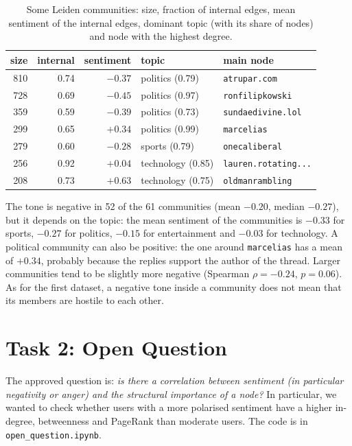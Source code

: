 \documentclass[sigchi]{acmart}
\begin{document}
\begin{table}[h]
  \caption{Some Leiden communities: size, fraction of internal edges, mean sentiment of the internal edges, dominant topic (with its share of nodes) and node with the highest degree.}
  \label{tab:comms}
  \footnotesize
  \setlength{\tabcolsep}{2.5pt}
  \begin{tabular}{rrrll}
    \toprule
    size & internal & sentiment & topic & main node \\
    \midrule
    810 & 0.74 & $-0.37$ & politics (0.79) & \texttt{atrupar.com} \\
    728 & 0.69 & $-0.45$ & politics (0.97) & \texttt{ronfilipkowski} \\
    359 & 0.59 & $-0.39$ & politics (0.73) & \texttt{sundaedivine.lol} \\
    299 & 0.65 & $+0.34$ & politics (0.99) & \texttt{marcelias} \\
    279 & 0.60 & $-0.28$ & sports (0.79) & \texttt{onecaliberal} \\
    256 & 0.92 & $+0.04$ & technology (0.85) & \texttt{lauren.rotating...} \\
    208 & 0.73 & $+0.63$ & technology (0.75) & \texttt{oldmanrambling} \\
    \bottomrule
  \end{tabular}
\end{table}

The tone is negative in 52 of the 61 communities (mean $-0.20$, median $-0.27$), but it depends on the topic: the mean sentiment of the communities is $-0.33$ for sports, $-0.27$ for politics, $-0.15$ for entertainment and $-0.03$ for technology. A political community can also be positive: the one around \texttt{marcelias} has a mean of $+0.34$, probably because the replies support the author of the thread. Larger communities tend to be slightly more negative (Spearman $\rho=-0.24$, $p=0.06$). As for the first dataset, a negative tone inside a community does not mean that its members are hostile to each other.

\section{Task 2: Open Question}\label{sec:oq}
The approved question is: \textit{is there a correlation between sentiment (in particular negativity or anger) and the structural importance of a node?} In particular, we wanted to check whether users with a more polarised sentiment have a higher in-degree, betweenness and PageRank than moderate users. The code is in \texttt{open\_question.ipynb}.
\end{document}
